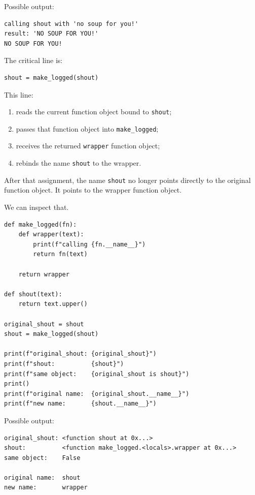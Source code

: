 Possible output:

\begin{verbatim}
calling shout with 'no soup for you!'
result: 'NO SOUP FOR YOU!'
NO SOUP FOR YOU!
\end{verbatim}

The critical line is:

\begin{verbatim}
shout = make_logged(shout)
\end{verbatim}

This line:

\begin{enumerate}
    \item reads the current function object bound to \texttt{shout};
    \item passes that function object into \texttt{make\_logged};
    \item receives the returned \texttt{wrapper} function object;
    \item rebinds the name \texttt{shout} to the wrapper.
\end{enumerate}

After that assignment, the name \texttt{shout} no longer points directly to the original function object. It points to the wrapper function object.

We can inspect that.

\begin{verbatim}
def make_logged(fn):
    def wrapper(text):
        print(f"calling {fn.__name__}")
        return fn(text)

    return wrapper

def shout(text):
    return text.upper()

original_shout = shout
shout = make_logged(shout)

print(f"original_shout: {original_shout}")
print(f"shout:          {shout}")
print(f"same object:    {original_shout is shout}")
print()
print(f"original name:  {original_shout.__name__}")
print(f"new name:       {shout.__name__}")
\end{verbatim}

Possible output:

\begin{verbatim}
original_shout: <function shout at 0x...>
shout:          <function make_logged.<locals>.wrapper at 0x...>
same object:    False

original name:  shout
new name:       wrapper
\end{verbatim}

